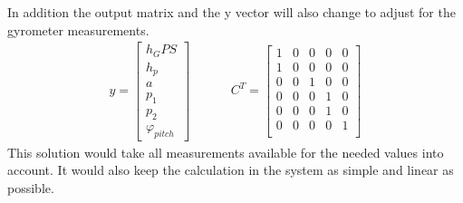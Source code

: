   
  In addition the output matrix and the y vector will also change to adjust for the gyrometer measurements.
  \begin{align*}
   y = \begin{bmatrix}
        h_GPS \\
        h_p \\
        a \\
        p_1\\
        p_2\\
        \varphi_{pitch}
       \end{bmatrix}
       & \hspace{1cm}
       C^T = \begin{bmatrix}
        1 & 0 & 0 & 0 & 0 \\
        1 & 0 & 0 & 0 & 0 \\
        0 & 0 & 1 & 0 & 0 \\
        0 & 0 & 0 & 1 & 0 \\
        0 & 0 & 0 & 1 & 0 \\
        0 & 0 & 0 & 0 & 1 \\
        \end{bmatrix}
  \end{align*}
  This solution would take all measurements available for the needed values into account.
  It would also keep the calculation in the system as simple and linear as possible.
